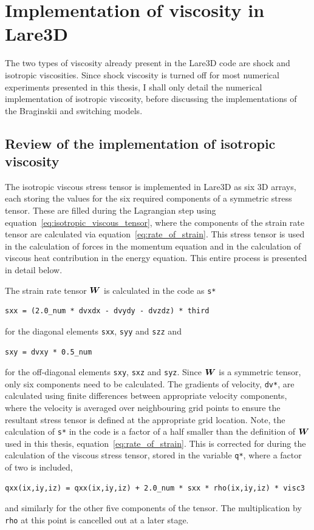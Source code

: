 \section{Implementation of viscosity in Lare3D}

The two types of viscosity already present in the Lare3D code are shock and isotropic viscosities. Since shock viscosity is turned off for most numerical experiments presented in this thesis, I shall only detail the numerical implementation of isotropic viscosity, before discussing the implementations of the Braginskii and switching models.

\subsection{Review of the implementation of isotropic viscosity}

The isotropic viscous stress tensor is implemented in Lare3D as six 3D arrays, each storing the values for the six required components of a symmetric stress tensor. These are filled during the Lagrangian step using equation~\ref{eq:isotropic_viscous_tensor}, where the components of the strain rate tensor are calculated via equation~\ref{eq:rate_of_strain}. This stress tensor is used in the calculation of forces in the momentum equation and in the calculation of viscous heat contribution in the energy equation. This entire process is presented in detail below.

The strain rate tensor ${\bm W}$ is calculated in the code as \verb|s*|
\begin{verbatim}
sxx = (2.0_num * dvxdx - dvydy - dvzdz) * third
\end{verbatim}
for the diagonal elements \verb|sxx|, \verb|syy| and \verb|szz| and
\begin{verbatim}
sxy = dvxy * 0.5_num
\end{verbatim}
for the off-diagonal elements \verb|sxy|, \verb|sxz| and \verb|syz|. Since ${\bm W}$ is a symmetric tensor, only six components need to be calculated. The gradients of velocity, \verb|dv*|, are calculated using finite differences between appropriate velocity components, where the velocity is averaged over neighbouring grid points to ensure the resultant stress tensor is defined at the appropriate grid location. Note, the calculation of \verb|s*| in the code is a factor of a half smaller than the definition of ${\bm W}$ used in this thesis, equation~\ref{eq:rate_of_strain}. This is corrected for during the calculation of the viscous stress tensor, stored in the variable \verb|q*|, where a factor of two is included,
\begin{verbatim}
qxx(ix,iy,iz) = qxx(ix,iy,iz) + 2.0_num * sxx * rho(ix,iy,iz) * visc3
\end{verbatim}
and similarly for the other five components of the tensor. The multiplication by \verb|rho| at this point is cancelled out at a later stage.

